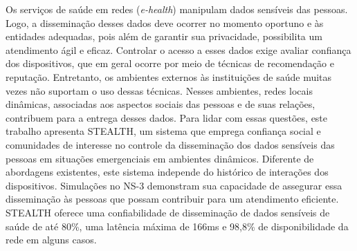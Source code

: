 \documentclass[12pt]{article}
\begin{document}
\begin{resumo} 

Os serviços de saúde em redes (\textit{e-health}) manipulam dados sensíveis das pessoas. Logo, a disseminação desses dados deve ocorrer no momento oportuno e às entidades adequadas, pois além de garantir sua privacidade, possibilita um atendimento ágil e eficaz.
Controlar o
acesso a esses dados exige
avaliar
confiança dos dispositivos, que em geral ocorre por meio de técnicas de recomendação e reputação. Entretanto, os ambientes externos às instituições de saúde muitas vezes
não suportam
o uso dessas técnicas. Nesses ambientes, redes locais dinâmicas, associadas aos aspectos sociais das pessoas e de suas relações, contribuem para a entrega desses dados. Para lidar com essas questões, este trabalho apresenta \mbox{STEALTH}, um sistema que emprega confiança social e comunidades de interesse no controle da disseminação dos dados sensíveis das pessoas em situações emergenciais em ambientes dinâmicos. Diferente de abordagens existentes, este sistema independe do histórico de interações dos dispositivos. Simulações no NS-3 demonstram sua capacidade de assegurar essa disseminação às pessoas que possam contribuir para um atendimento eficiente. \mbox{STEALTH} oferece uma confiabilidade de disseminação de dados sensíveis de saúde de até 80\%, uma latência máxima de 166ms e 98,8\% de disponibilidade da rede em alguns casos.

\end{resumo}
\end{document}
